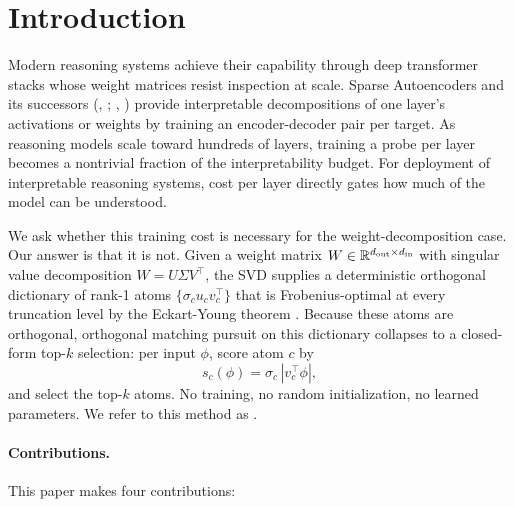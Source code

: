 \section{Introduction}

Modern reasoning systems achieve their capability through deep transformer stacks whose weight matrices resist inspection at scale. Sparse Autoencoders \citep{bricken2023towards,cunningham2023sparse} and its successors (\vpd, \citealp{bushnaq2026vpd}; \bsf, \citealp{goodfire2026bsf}) provide interpretable decompositions of one layer's activations or weights by training an encoder-decoder pair per target. As reasoning models scale toward hundreds of layers, training a probe per layer becomes a nontrivial fraction of the interpretability budget. For deployment of interpretable reasoning systems, cost per layer directly gates how much of the model can be understood.

We ask whether this training cost is necessary for the weight-decomposition case. Our answer is that it is not. Given a weight matrix $W \in \mathbb{R}^{d_\text{out} \times d_\text{in}}$ with singular value decomposition $W = U\Sigma V^\top$, the SVD supplies a deterministic orthogonal dictionary of rank-1 atoms $\{\sigma_c u_c v_c^\top\}$ that is Frobenius-optimal at every truncation level by the Eckart-Young theorem \citep{eckart1936approximation}. Because these atoms are orthogonal, orthogonal matching pursuit \citep{pati1993omp} on this dictionary collapses to a closed-form top-$k$ selection: per input $\phi$, score atom $c$ by
\begin{equation}
s_c(\phi) = \sigma_c \, |v_c^\top \phi|,
\label{eq:score}
\end{equation}
and select the top-$k$ atoms. No training, no random initialization, no learned parameters. We refer to this method as \svdomp.

\paragraph{Contributions.} This paper makes four contributions:

